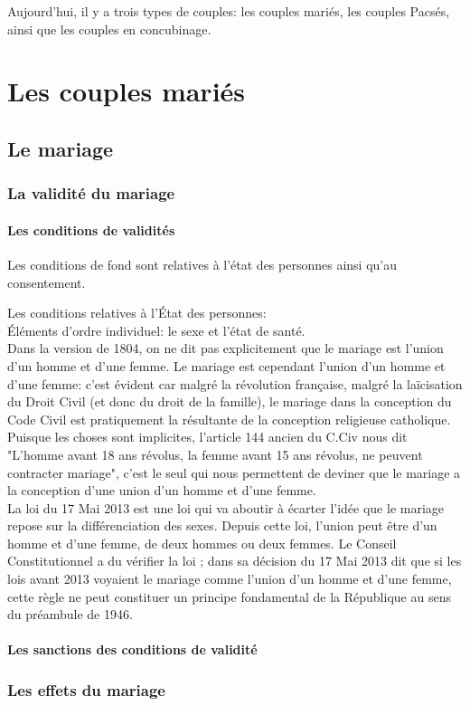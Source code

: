 \documentclass[12pt, a4paper, openany]{book}
\begin{document}
Aujourd'hui, il y a trois types de couples: les couples mariés, les couples Pacsés, ainsi que les couples en concubinage.

\chapter{Les couples mariés}

\section{Le mariage}

\subsection{La validité du mariage}

\subsubsection{Les conditions de validités}

Les conditions de fond sont relatives à l'état des personnes ainsi qu'au consentement.


Les conditions relatives à l'État des personnes: \\
Éléments d'ordre individuel: le sexe et l'état de santé. \\
Dans la version de 1804, on ne dit pas explicitement que le mariage est l'union d'un homme et d'une femme. Le mariage est cependant l'union d'un homme et d'une femme: c'est évident car malgré la révolution française, malgré la laïcisation du Droit Civil (et donc du droit de la famille), le mariage dans la conception du Code Civil est pratiquement la résultante de la conception religieuse catholique. Puisque les choses sont implicites, l'article 144 ancien du C.Civ nous dit "L'homme avant 18 ans révolus, la femme avant 15 ans révolus, ne peuvent contracter mariage", c'est le seul qui nous permettent de deviner que le mariage a la conception d'une union d'un homme et d'une femme. \\
La loi du 17 Mai 2013 est une loi qui va aboutir à écarter l'idée que le mariage repose sur la différenciation des sexes. Depuis cette loi, l'union peut être d'un homme et d'une femme, de deux hommes ou deux femmes. Le Conseil Constitutionnel a du vérifier la loi ; dans sa décision du 17 Mai 2013 dit que si les lois avant 2013 voyaient le mariage comme l'union d'un homme et d'une femme, cette règle ne peut constituer un principe fondamental de la République au sens du préambule de 1946. 


\subsubsection{Les sanctions des conditions de validité}


\subsection{Les effets du mariage}
\end{document}
